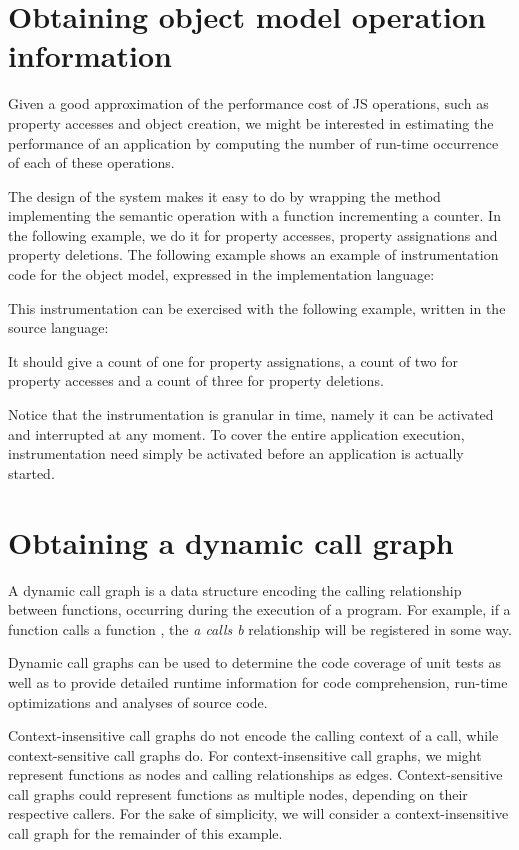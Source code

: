 \section{Obtaining object model operation information}
\label{sec:ObjectModelInstrumentation}

Given a good approximation of the performance cost of JS operations, such as
property accesses and object creation, we might be interested in estimating the
performance of an application by computing the number of run-time occurrence of
each of these operations.

The design of the system makes it easy to do by wrapping the method
implementing the semantic operation with a function incrementing a counter.  In
the following example, we do it for property accesses, property assignations
and property deletions. The following example shows an example of
instrumentation code for the object model, expressed in the
implementation language:


This instrumentation can be exercised with the following example, written in
the source language:


It should give a count of one for property assignations, a count of two for
property accesses and a count of three for property deletions.

Notice that the instrumentation is granular in time, namely it can be activated
and interrupted at any moment.  To cover the entire application execution,
instrumentation need simply be activated before an application is actually
started. 

\section{Obtaining a dynamic call graph}

A dynamic call graph is a data structure encoding the calling relationship
between functions, occurring during the execution of a program. For example, if
a function  calls a function , the \textit{a calls b} relationship
will be registered in some way. 

Dynamic call graphs can be used to determine the code coverage of unit tests as
well as to provide detailed runtime information for code comprehension,
run-time optimizations and analyses of source code. 

Context-insensitive call graphs do not encode the calling context of a call,
while context-sensitive call graphs do. For context-insensitive call graphs, we
might represent functions as nodes and calling relationships as edges.
Context-sensitive call graphs could represent functions as multiple nodes,
depending on their respective callers. For the sake of simplicity, we will
consider a context-insensitive call graph for the remainder of this example. 

